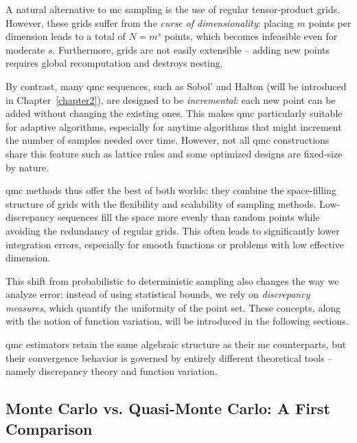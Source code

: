A natural alternative to \ac{mc} sampling is the use of regular tensor-product
grids. However, these grids suffer from the \emph{curse of dimensionality}:
placing $m$ points per dimension leads to a total of $N = m^s$ points, which
becomes infeasible even for moderate $s$. Furthermore, grids are not easily
extensible -- adding new points requires global recomputation and destroys
nesting.

By contrast, many \ac{qmc} sequences, such as Sobol' and Halton (will be
introduced in Chapter~\ref{chapter2}), are designed to be \emph{incremental}:
each new point can be added without changing the existing ones. This makes
\ac{qmc} particularly suitable for adaptive algorithms, especially for anytime
algorithms that might increment the number of samples needed over time. However,
not all \ac{qmc} constructions share this feature such as lattice rules and some
optimized designs are fixed-size by nature.

\ac{qmc} methods thus offer the best of both worlds: they combine the
space-filling structure of grids with the flexibility and scalability of
sampling methods. Low-discrepancy sequences fill the space more evenly than
random points while avoiding the redundancy of regular grids. This often leads
to significantly lower integration errors, especially for smooth functions or
problems with low effective dimension.

This shift from probabilistic to deterministic sampling also changes the way we
analyze error: instead of using statistical bounds, we rely on \emph{discrepancy
measures}, which quantify the uniformity of the point set. These concepts, along
with the notion of function variation, will be introduced in the following
sections.

\begin{remark}
\ac{qmc} estimators retain the same algebraic structure as their \ac{mc}
counterparts, but their convergence behavior is governed by entirely different
theoretical tools -- namely discrepancy theory and function variation.
\end{remark}


\subsection{Monte Carlo vs. Quasi-Monte Carlo: A First Comparison}
\label{subsec:mc-vs-qmc}

